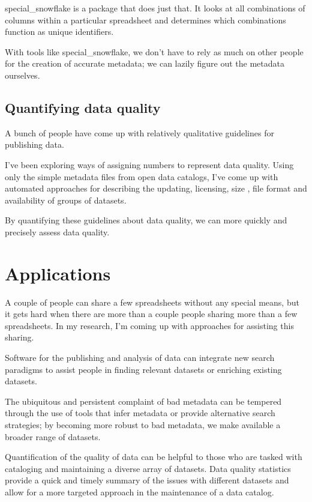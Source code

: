 \documentclass{acm_proc_article-sp}
\begin{document}
special\_snowflake \cite{specialsnowflake} is a package that does just that.
It looks at all combinations of columns within a particular spreadsheet and
determines which combinations function as unique identifiers.

With tools like special\_snowflake, we don't have to rely as much on other
people for the creation of accurate metadata; we can lazily figure out the
metadata ourselves.

\subsection{Quantifying data quality}
A bunch of people \cite{open-data-census,fivestars,sunlight,sebastopol,odi}
have come up with relatively qualitative guidelines for publishing data.

I've been exploring ways of assigning numbers to represent data quality.
Using only the simple metadata files from open data catalogs, I've come up
with automated approaches for describing the updating, \cite{updatedness}
licensing, \cite{licensing} size \cite{summary}, file format \cite{file-formats}
and availability \cite{dead,zombie} of groups of datasets.

By quantifying these guidelines about data quality, we can more quickly and
precisely assess data quality.

\section{Applications}
A couple of people can share a few spreadsheets without any special means,
but it gets hard when there are more than a couple people sharing more than
a few spreadsheets. In my research, I'm coming up with approaches for assisting
this sharing.

Software for the publishing and analysis of data can integrate new search
paradigms to assist people in finding relevant datasets or enriching existing
datasets.

The ubiquitous and persistent complaint of bad metadata can be tempered through
the use of tools that infer metadata or provide alternative search strategies;
by becoming more robust to bad metadata, we make available a broader range of
datasets.

Quantification of the quality of data can be helpful to those who are tasked
with cataloging and maintaining a diverse array of datasets. Data quality
statistics provide a quick and timely summary of the issues with different
datasets and allow for a more targeted approach in the maintenance of a
data catalog.
\end{document}
